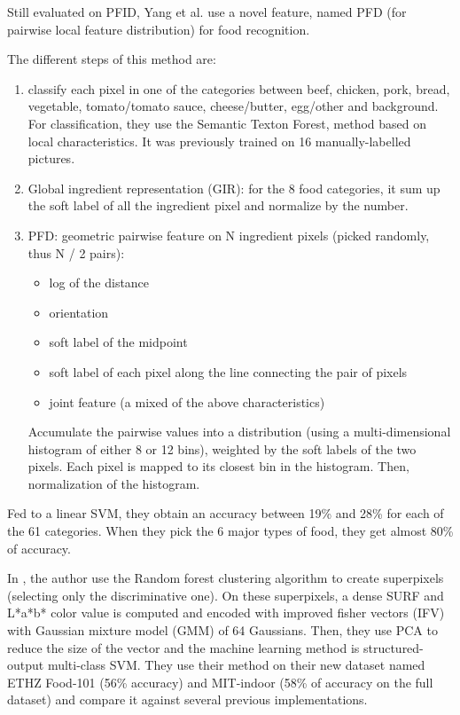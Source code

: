 Still evaluated on PFID, Yang et al. \cite{Yang2010} use a novel feature, named PFD (for pairwise local feature distribution) for food recognition.

The different steps of this method are:
\begin{enumerate}
    \item classify each pixel in one of the categories between beef, chicken, pork, bread, vegetable,  tomato/tomato sauce, cheese/butter, egg/other and background. For classification, they use the Semantic Texton Forest, method based on local characteristics. It was previously trained on 16 manually-labelled pictures.
    
    \item Global ingredient representation (GIR): for the 8 food categories, it sum up the soft label of all the ingredient pixel and normalize by the number.
    
    \item PFD: geometric pairwise feature on N ingredient pixels (picked randomly, thus N / 2 pairs):
    \begin{itemize}
        \item log of the distance
        \item orientation
        \item soft label of the midpoint
        \item soft label of each pixel along the line connecting the pair of pixels
        \item joint feature (a mixed of the above characteristics)
    \end{itemize}
    Accumulate the pairwise values into a distribution (using a multi-dimensional histogram of either 8 or 12 bins), weighted by the soft labels of the two pixels. Each pixel is mapped to its closest bin in the histogram.
    Then, normalization of the histogram.
\end{enumerate}

Fed to a linear SVM, they obtain an accuracy between 19\% and 28\% for each of the 61 categories.
When they pick the 6 major types of food, they get almost 80\% of accuracy.


In \cite{Bossard2014}, the author use the Random forest clustering algorithm to create superpixels (selecting only the discriminative one). On these superpixels, a dense SURF and L*a*b* color value is computed and encoded with improved fisher vectors (IFV) with Gaussian mixture model (GMM) of 64 Gaussians.
Then, they use PCA to reduce the size of the vector and the machine learning method is structured-output multi-class SVM. They use their method on their new dataset named ETHZ Food-101 (56\% accuracy) and MIT-indoor (58\% of accuracy on the full dataset) and compare it against several previous implementations.


